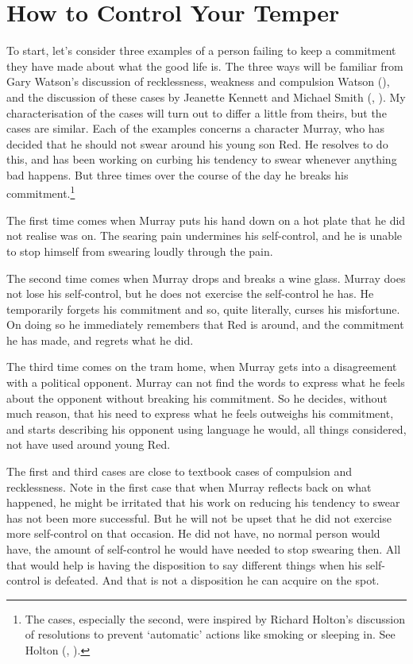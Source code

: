 \documentclass[
  11pt,
  letterpaper,
  DIV=11,
  numbers=noendperiod,
  twoside]{scrartcl}
\begin{document}
\section{How to Control Your Temper}\label{how-to-control-your-temper}

To start, let's consider three examples of a person failing to keep a
commitment they have made about what the good life is. The three ways
will be familiar from Gary Watson's discussion of recklessness, weakness
and compulsion Watson (), and the
discussion of these cases by Jeanette Kennett and Michael Smith
(,
). My characterisation of the
cases will turn out to differ a little from theirs, but the cases are
similar. Each of the examples concerns a character Murray, who has
decided that he should not swear around his young son Red. He resolves
to do this, and has been working on curbing his tendency to swear
whenever anything bad happens. But three times over the course of the
day he breaks his commitment.\footnote{The cases, especially the second,
  were inspired by Richard Holton's discussion of resolutions to prevent
  `automatic' actions like smoking or sleeping in. See Holton
  (, ).}

The first time comes when Murray puts his hand down on a hot plate that
he did not realise was on. The searing pain undermines his self-control,
and he is unable to stop himself from swearing loudly through the pain.

The second time comes when Murray drops and breaks a wine glass. Murray
does not lose his self-control, but he does not exercise the
self-control he has. He temporarily forgets his commitment and so, quite
literally, curses his misfortune. On doing so he immediately remembers
that Red is around, and the commitment he has made, and regrets what he
did.

The third time comes on the tram home, when Murray gets into a
disagreement with a political opponent. Murray can not find the words to
express what he feels about the opponent without breaking his
commitment. So he decides, without much reason, that his need to express
what he feels outweighs his commitment, and starts describing his
opponent using language he would, all things considered, not have used
around young Red.

The first and third cases are close to textbook cases of compulsion and
recklessness. Note in the first case that when Murray reflects back on
what happened, he might be irritated that his work on reducing his
tendency to swear has not been more successful. But he will not be upset
that he did not exercise more self-control on that occasion. He did not
have, no normal person would have, the amount of self-control he would
have needed to stop swearing then. All that would help is having the
disposition to say different things when his self-control is defeated.
And that is not a disposition he can acquire on the spot.
\end{document}
